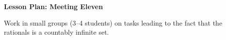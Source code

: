 \documentclass[12pt]{amsart}
\theoremstyle{definition}
\begin{document}
\begin{center}
\textbf{\Huge
Lesson Plan: Meeting Eleven}

\end{center}
\vspace{.5in}

Work in small groups (3--4 students) on tasks leading to the fact that the rationals is a countably infinite set.
\end{document}
